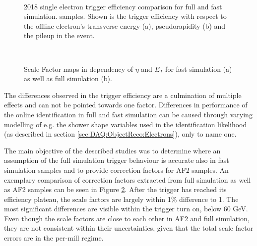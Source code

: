 \begin{figure}[h]\centering
  \\
  \caption{2018 single electron trigger efficiency comparison for full and fast simulation.  samples. Shown is the trigger efficiency with respect to the offline electron's transverse energy (a),  pseudorapidity (b) and the pileup in the event.}
  \label{}
\end{figure}

\begin{figure}[h]
  \centering
  \\
  \caption{Scale Factor maps in dependency of $\eta$ and $E_T$ for fast simulation (a) as well as full simulation (b). 
  \label{fig:SF:AF2FScomparison}}
\end{figure}

The differences observed in the trigger efficiency are a culmination of multiple effects and can not be pointed towards one factor.  Differences in performance of the online identification in full and fast simulation can be caused through varying modelling of e.g. the shower shape variables used in the identification likelihood (as described in section \ref{sec:DAQ:ObjectReco:Electrons}), only to name one.  


The main objective of the described studies was to determine where an assumption of the full simulation trigger behaviour is accurate also in fast simulation samples and to provide correction factors for AF2 samples.
An exemplary comparison of correction factors extracted from full simulation as well as AF2 samples can be seen in Figure \ref{fig:SF:AF2FScomparison}.
After the trigger has reached its efficiency plateau, the scale factors are largely within 1\% difference to 1.
The most significant differences are visible within the trigger turn on,  below 60 GeV.  Even though the scale factors are close to each other in AF2 and full simulation,  they are not consistent within their uncertainties,  given that the total scale factor errors are in the per-mill regime.

